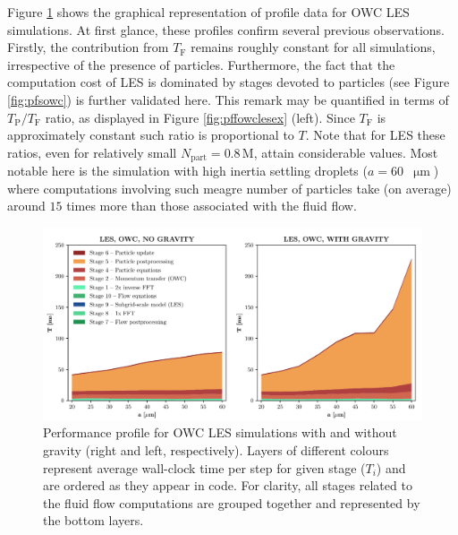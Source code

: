 \documentclass{pracamgren}
\begin{document}
\medskip

Figure \ref{fig:pffowcles} shows the graphical representation of profile data for OWC LES simulations.
At first glance, these profiles confirm several previous observations.
Firstly, the contribution from $T_\text{F}$ remains roughly constant for all simulations, irrespective of the presence of particles.
Furthermore, the fact that the computation cost of LES is dominated by stages devoted to particles (see Figure \ref{fig:pfsowc}) is further validated here.
This remark may be quantified in terms of $T_{\text{P}} / T_{\text{F}}$ ratio, as displayed in Figure \ref{fig:pffowclesex} (left).
Since $T_{\text{F}}$ is approximately constant such ratio is proportional to $T$.
Note that for LES these ratios, even for relatively small $N_{\text{part}} = 0.8 \, \text{M}$, attain considerable values.
Most notable here is the simulation with high inertia settling droplets ($a = 60$~$\upmu\text{m}$) where computations involving such meagre number of particles take (on average) around $15$ times more than those associated with the fluid flow.

\begin{figure}[ht]
\centering
\includegraphics[width=13.5cm]{figures/3-06_pffowcles.pdf}
\caption{
Performance profile for OWC LES simulations with and without gravity (right and left, respectively).
Layers of different colours represent average wall-clock time per step for given stage ($T_i$) and are ordered as they appear in code.
For clarity, all stages related to the fluid flow computations are grouped together and represented by the bottom layers.
}
\label{fig:pffowcles}
\end{figure}
\end{document}
